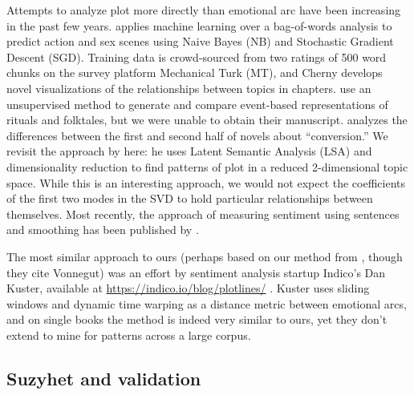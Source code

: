{Attempts to analyze plot more directly than emotional arc have been increasing in the past few years.
\cite{cherny2013bones} applies machine learning over a bag-of-words analysis to predict action and sex scenes using Naive Bayes (NB) and Stochastic Gradient Descent (SGD).
Training data is crowd-sourced from two ratings of 500 word chunks on the survey platform Mechanical Turk (MT), and Cherny develops novel visualizations of the relationships between topics in chapters.
\cite{reiter2014nlp} use an unsupervised method to generate and compare event-based representations of rituals and folktales, but we were unable to obtain their manuscript.
\cite{piper2015novel} analyzes the differences between the first and second half of novels about ``conversion.'' 
We revisit the approach by \cite{schmidt2015plot} here: he uses Latent Semantic Analysis (LSA) and dimensionality reduction to find patterns of plot in a reduced 2-dimensional topic space.
While this is an interesting approach, we would not expect the coefficients of the first two modes in the SVD to hold particular relationships between themselves.
Most recently, the approach of measuring sentiment using sentences and smoothing has been published by \cite{gao2016multiscale}.

The most similar approach to ours (perhaps based on our method from \cite{dodds2015human}, though they cite Vonnegut) was an effort by sentiment analysis startup Indico's Dan Kuster, available at \href{https://indico.io/blog/plotlines/}{https://indico.io/blog/plotlines/} \citep{kuster2015exploring}.
Kuster uses sliding windows and dynamic time warping as a distance metric between emotional arcs, and on single books the method is indeed very similar to ours, yet they don't extend to mine for patterns across a large corpus.

\subsection{Suzyhet and validation}

}
